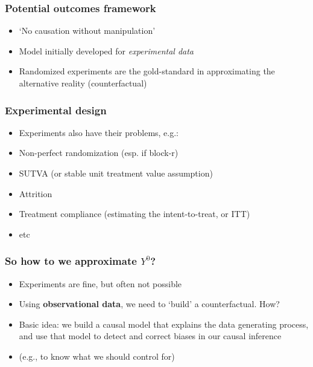 \documentclass[aspectratio=43]{beamer}
\begin{document}
\begin{frame}
\frametitle{Potential outcomes framework}
\centering

\begin{itemize}
  \item<1-> `No causation without manipulation'
  \item<1-> Model initially developed for \textit{experimental data}
  \item<2-> Randomized experiments are the gold-standard in approximating the alternative reality (counterfactual)
\end{itemize}

\end{frame}

\begin{frame}
\frametitle{Experimental design}
\centering

\begin{itemize}[<+->]
  \item[] Experiments also have their problems, e.g.:
  \item Non-perfect randomization (esp. if block-r)
  \item SUTVA (or stable unit treatment value assumption)
  \item Attrition
  \item Treatment compliance (estimating the intent-to-treat, or ITT)
  \item etc
\end{itemize}

\end{frame}


\begin{frame}
\frametitle{So how to we approximate $Y^{0}$?}
\centering

\begin{itemize}[<+->]
  \item Experiments are fine, but often not possible
  \item Using \textbf{observational data}, we need to `build' a counterfactual. How?
  \item Basic idea: we build a causal model that explains the data generating process, and use that model to detect and correct biases in our causal inference
  \item[] (e.g., to know what we should control for)
\end{itemize}

\end{frame}
\end{document}
